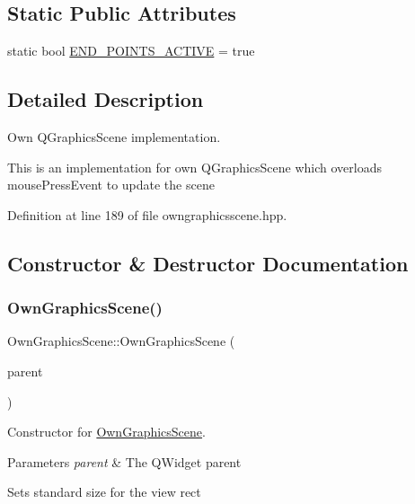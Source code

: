 \subsection*{Static Public Attributes}
\begin{DoxyCompactItemize}
\item 
static bool \mbox{\hyperlink{classOwnGraphicsScene_a511dd73ffc0a5f3ee28e8950d0636f5e}{E\+N\+D\+\_\+\+P\+O\+I\+N\+T\+S\+\_\+\+A\+C\+T\+I\+VE}} = true
\end{DoxyCompactItemize}


\subsection{Detailed Description}
Own Q\+Graphics\+Scene implementation. 

This is an implementation for own Q\+Graphics\+Scene which overloads mouse\+Press\+Event to update the scene 

Definition at line 189 of file owngraphicsscene.\+hpp.



\subsection{Constructor \& Destructor Documentation}
\mbox{\label{classOwnGraphicsScene_a242b82147a469314e4c7fb5af69c265f}} 
\subsubsection{\texorpdfstring{Own\+Graphics\+Scene()}{OwnGraphicsScene()}}
{\footnotesize\ttfamily Own\+Graphics\+Scene\+::\+Own\+Graphics\+Scene (\begin{DoxyParamCaption}\item[{Q\+Widget $\ast$}]{parent }\end{DoxyParamCaption})\hspace{0.3cm}{\ttfamily [inline]}}



Constructor for \mbox{\hyperlink{classOwnGraphicsScene}{Own\+Graphics\+Scene}}. 


\begin{DoxyParams}{Parameters}
{\em parent} & The Q\+Widget parent\\
\hline
\end{DoxyParams}
Sets standard size for the view rect 

